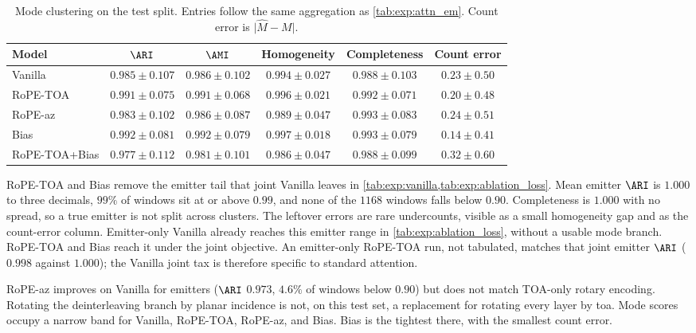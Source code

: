 \begin{table}[tbp]
  \centering
  \small
  \caption{Mode clustering on the test split. Entries follow the same aggregation as \cref{tab:exp:attn_em}. Count error is $\lvert\hat{M}-M\rvert$.}
  \label{tab:exp:attn_md}
  \begin{tabular}{@{}lccccc@{}}
    \toprule
    Model & $\ARI$ & $\AMI$ & Homogeneity & Completeness & Count error \\
    \midrule
    Vanilla   & $0.985\pm0.107$ & $0.986\pm0.102$ & $0.994\pm0.027$ & $0.988\pm0.103$ & $0.23\pm0.50$ \\
    RoPE-TOA  & $0.991\pm0.075$ & $0.991\pm0.068$ & $0.996\pm0.021$ & $0.992\pm0.071$ & $0.20\pm0.48$ \\
    RoPE-az   & $0.983\pm0.102$ & $0.986\pm0.087$ & $0.989\pm0.047$ & $\mathbf{0.993\pm0.083}$ & $0.24\pm0.51$ \\
    Bias      & $\mathbf{0.992\pm0.081}$ & $\mathbf{0.992\pm0.079}$ & $\mathbf{0.997\pm0.018}$ & $\mathbf{0.993\pm0.079}$ & $\mathbf{0.14\pm0.41}$ \\
    RoPE-TOA+Bias & $0.977\pm0.112$ & $0.981\pm0.101$ & $0.986\pm0.047$ & $0.988\pm0.099$ & $0.32\pm0.60$ \\
    \bottomrule
  \end{tabular}
\end{table}

RoPE-TOA and Bias remove the emitter tail that joint Vanilla leaves in \cref{tab:exp:vanilla,tab:exp:ablation_loss}.
Mean emitter $\ARI$ is $1.000$ to three decimals, $99\%$ of windows sit at or above $0.99$, and none of the $1168$ windows falls below $0.90$.
Completeness is $1.000$ with no spread, so a true emitter is not split across clusters.
The leftover errors are rare undercounts, visible as a small homogeneity gap and as the count-error column.
Emitter-only Vanilla already reaches this emitter range in \cref{tab:exp:ablation_loss}, without a usable mode branch.
RoPE-TOA and Bias reach it under the joint objective.
An emitter-only RoPE-TOA run, not tabulated, matches that joint emitter $\ARI$ ($0.998$ against $1.000$); the Vanilla joint tax is therefore specific to standard attention.

RoPE-az improves on Vanilla for emitters ($\ARI$ $0.973$, $4.6\%$ of windows below $0.90$) but does not match TOA-only rotary encoding.
Rotating the deinterleaving branch by planar incidence is not, on this test set, a replacement for rotating every layer by \gls{toa}.
Mode scores occupy a narrow band for Vanilla, RoPE-TOA, RoPE-az, and Bias.
Bias is the tightest there, with the smallest count error.

